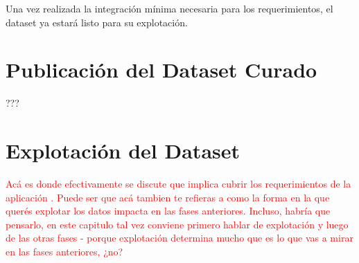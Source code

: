 Una vez realizada la integración mínima necesaria para los requerimientos, el dataset ya estará listo para su explotación.

\section{Publicación del Dataset Curado}
???

\section{Explotación del Dataset}
\begin{framed}
\textcolor{red}{Acá es donde efectivamente se discute que implica cubrir los requerimientos de la aplicación . Puede ser que acá tambien te refieras a como la forma en la que querés explotar los datos impacta en las fases anteriores. Incluso, habría que pensarlo, en este capitulo tal vez conviene primero hablar de explotación y luego de las otras fases - porque explotación determina mucho que es lo que vas a mirar en las fases anteriores, ¿no?}
\end{framed}

